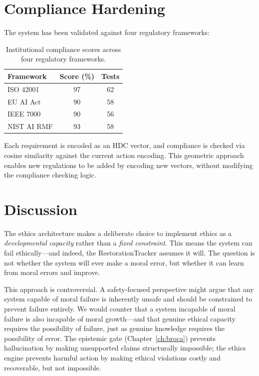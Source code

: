 \documentclass[12pt]{book}
\begin{document}
\section{Compliance Hardening}

The system has been validated against four regulatory frameworks:

\begin{table}[H]
\centering
\caption{Institutional compliance scores across four regulatory frameworks.}
\label{tab:compliance}
\begin{tabular}{lcc}
\toprule
\textbf{Framework} & \textbf{Score (\%)} & \textbf{Tests} \\
\midrule
ISO 42001 & 97 & 62 \\
EU AI Act & 90 & 58 \\
IEEE 7000 & 90 & 56 \\
NIST AI RMF & 93 & 58 \\
\bottomrule
\end{tabular}
\end{table}

Each requirement is encoded as an HDC vector, and compliance is checked via cosine similarity against the current action encoding. This geometric approach enables new regulations to be added by encoding new vectors, without modifying the compliance checking logic.

\section{Discussion}

The ethics architecture makes a deliberate choice to implement ethics as a \textit{developmental capacity} rather than a \textit{fixed constraint}. This means the system can fail ethically---and indeed, the RestorationTracker assumes it will. The question is not whether the system will ever make a moral error, but whether it can learn from moral errors and improve.

This approach is controversial. A safety-focused perspective might argue that any system capable of moral failure is inherently unsafe and should be constrained to prevent failure entirely. We would counter that a system incapable of moral failure is also incapable of moral growth---and that genuine ethical capacity requires the possibility of failure, just as genuine knowledge requires the possibility of error. The epistemic gate (Chapter~\ref{ch:broca}) prevents hallucination by making unsupported claims structurally impossible; the ethics engine prevents harmful action by making ethical violations costly and recoverable, but not impossible.
\end{document}

